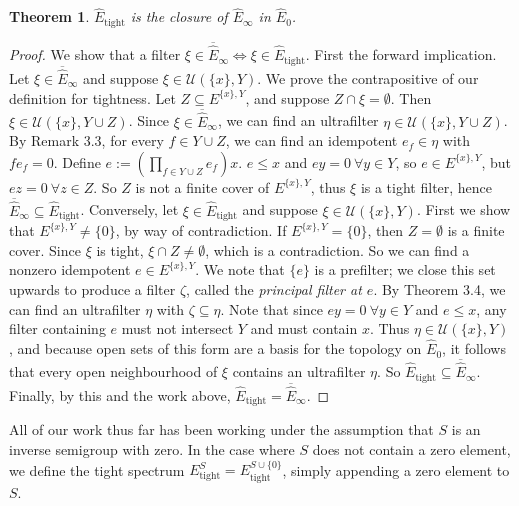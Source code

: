 \documentclass[12pt]{article}
\newtheorem{theorem}{Theorem}[section]
\theoremstyle{definition}
\begin{document}
\begin{theorem} $\hat{E}_{\text{tight}}$ is the closure of $\hat{E}_\infty$ in $\hat{E}_0$. \end{theorem}
\begin{proof}
    We show that a filter $\xi \in \overline{\hat{E}}_\infty \iff \xi \in \hat{E}_{\text{tight}}$. First
    the forward implication. Let $\xi \in \overline{\hat{E}}_\infty$ and suppose $\xi \in \mathcal{U}(\{x\}, Y)$.
    We prove the contrapositive of our definition for tightness. Let $Z \subseteq E^{\{x\}, Y}$, and suppose $Z \cap \xi = \emptyset$.
    Then $\xi \in \mathcal{U}(\{x\}, Y \cup Z)$. Since $\xi \in \overline{\hat{E}}_\infty$, we can find an ultrafilter
    $\eta \in \mathcal{U}(\{x\}, Y \cup Z)$. By Remark 3.3, for every $f \in Y \cup Z$, we can find an idempotent $e_f \in \eta$
    with $f e_f = 0$. Define $e := \left( \prod_{f \in Y \cup Z} e_f \right) x$. $e \leq x$ and $ey = 0 \ \forall y \in Y$, so
    $e \in E^{\{x\}, Y}$, but $ez = 0 \ \forall z \in Z$. So $Z$ is not a finite cover of $E^{\{x\}, Y}$, thus $\xi$ is a tight filter,
    hence $\overline{\hat{E}}_\infty \subseteq \hat{E}_{\text{tight}}$. 
    \newline
    Conversely, let $\xi \in \hat{E}_{\text{tight}}$ and suppose $\xi \in \mathcal{U}(\{x\}, Y)$.
    First we show that $E^{\{x\}, Y} \neq \{0\}$, by way of contradiction. If $E^{\{x\}, Y} = \{0\}$, then $Z = \emptyset$ is a finite cover.
    Since $\xi$ is tight, $\xi \cap Z \neq \emptyset$, which is a contradiction. So we can find a nonzero idempotent $e \in E^{\{x\}, Y}$.
    We note that $\{e\}$ is a prefilter; we close this set upwards to produce a filter $\zeta$, called the \emph{principal filter at $e$}.
    By Theorem 3.4, we can find an ultrafilter $\eta$ with $\zeta \subseteq \eta$. Note that since 
    $ey = 0 \ \forall y \in Y$ and $e \leq x$, any filter containing $e$ must not intersect $Y$ and must contain $x$.
    Thus $\eta \in \mathcal{U}(\{x\}, Y)$, and because open sets of this form are a basis for the topology on $\hat{E}_0$,
    it follows that every open neighbourhood of $\xi$ contains an ultrafilter $\eta$. So $\hat{E}_\text{tight} \subseteq \overline{\hat{E}}_\infty$.
    Finally, by this and the work above, $\hat{E}_\text{tight} = \overline{\hat{E}}_\infty$.
\end{proof}

All of our work thus far has been working under the assumption that $S$ is an inverse
semigroup with zero. In the case where $S$ does not contain a zero element, we define 
the tight spectrum $E_\text{tight}^S = E_\text{tight}^{S \cup \{0\}}$, simply appending
a zero element to $S$.
\end{document}

